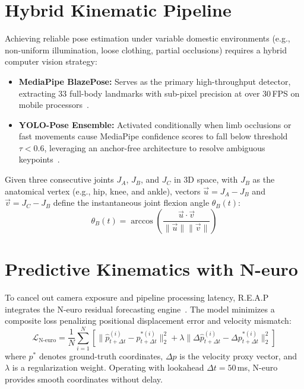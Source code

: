 \documentclass[12pt,a4paper]{report}
\begin{document}
\section{Hybrid Kinematic Pipeline}
Achieving reliable pose estimation under variable domestic environments (e.g., non-uniform illumination, loose clothing, partial occlusions) requires a hybrid computer vision strategy:
\begin{itemize}
    \item \textbf{MediaPipe BlazePose:} Serves as the primary high-throughput detector, extracting 33 full-body landmarks with sub-pixel precision at over 30\,FPS on mobile processors~\cite{bazarevsky2020blazepose}.
    \item \textbf{YOLO-Pose Ensemble:} Activated conditionally when limb occlusions or fast movements cause MediaPipe confidence scores to fall below threshold $\tau < 0.6$, leveraging an anchor-free architecture to resolve ambiguous keypoints~\cite{maji2022yolopose}.
\end{itemize}

Given three consecutive joints $J_A$, $J_B$, and $J_C$ in 3D space, with $J_B$ as the anatomical vertex (e.g., hip, knee, and ankle), vectors $\vec{u} = J_A - J_B$ and $\vec{v} = J_C - J_B$ define the instantaneous joint flexion angle $\theta_B(t)$:
\begin{equation}
    \theta_B(t) = \arccos\left(\frac{\vec{u} \cdot \vec{v}}{\|\vec{u}\| \|\vec{v}\|}\right)
    \label{eq:joint_angle}
\end{equation}

\section{Predictive Kinematics with N-euro}
To cancel out camera exposure and pipeline processing latency, R.E.A.P integrates the N-euro residual forecasting engine~\cite{shao2023neuro}. The model minimizes a composite loss penalizing positional displacement error and velocity mismatch:
\begin{equation}
    \mathcal{L}_{\text{N-euro}} = \frac{1}{N}\sum_{i=1}^{N} \left[ \|\hat{p}_{t+\Delta t}^{(i)} - p_{t+\Delta t}^{*(i)}\|_2^2 + \lambda \|\Delta\hat{p}_{t+\Delta t}^{(i)} - \Delta p_{t+\Delta t}^{*(i)}\|_2^2 \right]
    \label{eq:neuroloss}
\end{equation}
where $p^*$ denotes ground-truth coordinates, $\Delta p$ is the velocity proxy vector, and $\lambda$ is a regularization weight. Operating with lookahead $\Delta t = 50$\,ms, N-euro provides smooth coordinates without delay.
\end{document}
